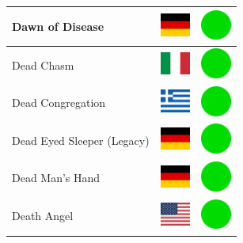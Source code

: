 \documentclass[12pt, a4paper, twoside]{report}
\begin{document}
\begin{center}
\begin{longtable}{|p{5cm}|p{2cm}|p{2cm}|}
 Dawn of Disease                                            & \includegraphics[width=1cm]{../4x3/de} &   \includegraphics[width=1cm]{../likes/y} \\ \hline
 Dead Chasm                                                 & \includegraphics[width=1cm]{../4x3/it} &   \includegraphics[width=1cm]{../likes/y} \\ \hline
 Dead Congregation                                          & \includegraphics[width=1cm]{../4x3/gr} &   \includegraphics[width=1cm]{../likes/y} \\ \hline
 Dead Eyed Sleeper (Legacy)                                 & \includegraphics[width=1cm]{../4x3/de} &   \includegraphics[width=1cm]{../likes/y} \\ \hline
 Dead Man's Hand                                            & \includegraphics[width=1cm]{../4x3/de} &   \includegraphics[width=1cm]{../likes/y} \\ \hline
 Death Angel                                                & \includegraphics[width=1cm]{../4x3/us} &   \includegraphics[width=1cm]{../likes/y} \\ \hline

\end{longtable}
\end{center}
\end{document}
